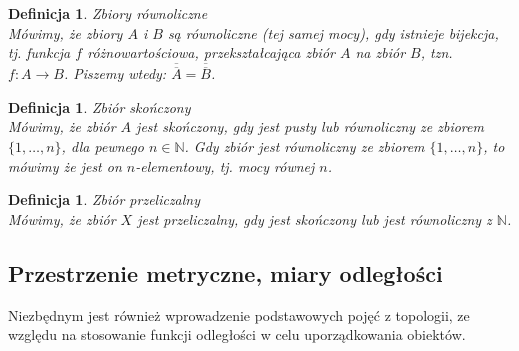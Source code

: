 \documentclass[12pt,a4paper]{report}
\newtheorem{definition}[theorem]{Definicja}
\newcommand{\licznosc}[1]{\overline{\overline{#1}}}
\begin{document}
\begin{definition}{Zbiory równoliczne \cite[Rozdział 5]{blaszczyk2007}}\\
Mówimy, że zbiory $A$ i $B$ są równoliczne (tej samej mocy), gdy istnieje bijekcja, tj. funkcja $f$ różnowartościowa, przekształcająca zbiór $A$ na zbiór $B$, tzn. $f: A \rightarrow B$. Piszemy wtedy:  $\licznosc{A}=\licznosc{B}$.
\end{definition}


\begin{definition}{Zbiór skończony \cite[Rozdział 5]{blaszczyk2007}}\\
Mówimy, że zbiór $A$ jest skończony, gdy jest pusty lub równoliczny ze zbiorem $\{1, \ldots, n \}$, dla pewnego $n \in \mathbb{N}$. Gdy zbiór jest równoliczny ze zbiorem $\{1, \ldots, n\}$, to mówimy że jest on $n$-elementowy, tj. mocy równej $n$.
\end{definition}


\begin{definition}{Zbiór przeliczalny \cite[Rozdział 5]{blaszczyk2007}}\\
Mówimy, że zbiór $X$ jest przeliczalny, gdy jest skończony lub jest równoliczny z $\mathbb{N}$.
\end{definition}






\subsection{Przestrzenie metryczne, miary odległości}


Niezbędnym jest również wprowadzenie podstawowych pojęć z topologii, ze względu na stosowanie funkcji odległości w celu uporządkowania obiektów.
\end{document}
